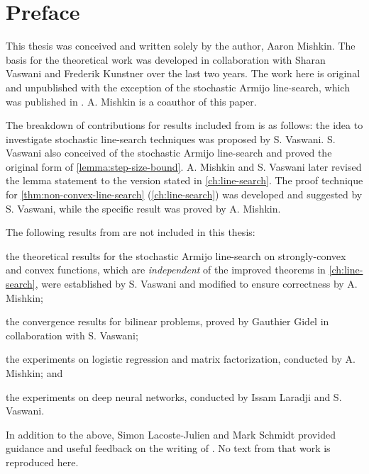 
\chapter{Preface}

This thesis was conceived and written solely by the author, Aaron Mishkin. 
The basis for the theoretical work was developed in collaboration with Sharan Vaswani and Frederik Kunstner over the last two years.
The work here is original and unpublished with the exception of the stochastic Armijo line-search, which was published in \citet{vaswani2019painless}. 
A. Mishkin is a coauthor of this paper. 

The breakdown of contributions for results included from \citet{vaswani2019painless} is as follows: 
the idea to investigate stochastic line-search techniques was proposed by S. Vaswani.
S. Vaswani also conceived of the stochastic Armijo line-search and proved the original form of \autoref{lemma:step-size-bound}. 
A. Mishkin and S. Vaswani later revised the lemma statement to the version stated in \autoref{ch:line-search}.
The proof technique for \autoref{thm:non-convex-line-search} (\autoref{ch:line-search}) was developed and suggested by S. Vaswani, while the specific result was proved by A. Mishkin. 

The following results from \citet{vaswani2019fast} are not included in this thesis: 
\begin{inparaenum}[(i)]
    \item  the theoretical results for the stochastic Armijo line-search on strongly-convex and convex functions, which are \emph{independent} of the improved theorems in \autoref{ch:line-search}, were established by S. Vaswani and modified to ensure correctness by A. Mishkin; 
    \item the convergence results for bilinear problems, proved by Gauthier Gidel in collaboration with S. Vaswani; 
    \item the experiments on logistic regression and matrix factorization, conducted by A. Mishkin; and 
    \item the experiments on deep neural networks, conducted by Issam Laradji and S. Vaswani.
\end{inparaenum}
In addition to the above, Simon Lacoste-Julien and Mark Schmidt provided guidance and useful feedback on the writing of \citet{vaswani2019fast}.
No text from that work is reproduced here.


